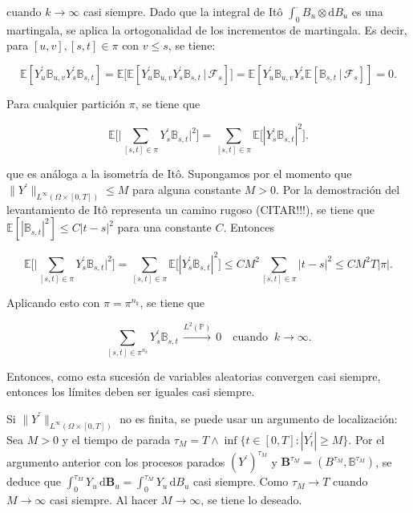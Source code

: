 cuando $k \rightarrow \infty$ casi siempre. Dado que la integral de Itô $\int_{0}^{\cdot}B_{u}\otimes\mathrm{d}B_{u}$ es una martingala, se aplica la ortogonalidad de los incrementos de martingala. Es decir, para $[u,v],[s,t]\in\pi$ con $v\leq s$, se tiene: 

\[
\mathbb{E}[Y^{\prime}_{u}\mathbb{B}_{u,v}Y^{\prime}_{s}\mathbb{B}_{s,t}]=\mathbb{E}\big[\mathbb{E}[Y^{\prime}_{u}\mathbb{B}_{u,v}Y^{\prime}_{s}\mathbb{B}_{s,t}\,|\,\mathcal{F}_{s}]\big]=\mathbb{E}[Y^{\prime}_{u}\mathbb{B}_{u,v}Y^{\prime}_{s}\mathbb{E}[\mathbb{B}_{s,t}\,|\,\mathcal{F}_{s}]]=0.
\]

Para cualquier partición $\pi$, se tiene que

\[
\mathbb{E}\bigg[\bigg|\sum_{[s,t]\in\pi}Y^{\prime}_{s}\mathbb{B}_{s,t}\bigg|^{2}\bigg]=\sum_{[s,t]\in\pi}\mathbb{E}\big[|Y^{\prime}_{s}\mathbb{B}_{s,t}|^{2}\big].
\]


que es análoga a la isometría de Itô. Supongamos por el momento que $\|Y^{\prime}\|_{L^{\infty}(\Omega\times[0,T])}\leq M$ para alguna constante $M>0$. Por la demostración del levantamiento de Itô representa un camino rugoso (CITAR!!!), se tiene que $\mathbb{E}[\left|\mathbb{B}_{s,t}\right|^{2}]\leq C|t-s|^{2}$ para una constante $C$. Entonces

\[
\mathbb{E}\bigg[\bigg|\sum_{[s,t]\in\pi}Y^{\prime}_{s}\mathbb{B}_{s,t}\bigg|^{2}\bigg]=\sum_{[s,t]\in\pi}\mathbb{E}\big[|Y^{\prime}_{s}\mathbb{B}_{s,t}|^{2}\big]\leq CM^{2}\sum_{[s,t]\in\pi}|t-s|^{2}\leq CM^{2}T|\pi|. %
\]

Aplicando esto con $\pi=\pi^{n_{k}}$, se tiene que

\[
\sum_{[s,t]\in\pi^{n_{k}}}Y^{\prime}_{s}\mathbb{B}_{s,t}\,\xrightarrow{L^{2}(\mathbb{P})}\,0\quad \text{cuando}\;\;k\to\infty.
\]

Entonces, como esta sucesión de variables aleatorias convergen casi siempre, entonces los límites deben ser iguales casi siempre.

Si $\|Y^{\prime}\|_{L^{\infty}(\Omega\times[0,T])}$ no es finita, se puede usar un argumento de localización: Sea $M>0$ y el tiempo de parada $\tau_{M}=T\wedge\inf\{t\in[0,T]:|Y^{\prime}_{t}|\geq M\}$. Por el argumento anterior con los procesos parados $(Y^{\prime})^{\tau_{M}}$ y $\mathbf{B}^{\tau_{M}}=(B^{\tau_{M}},\mathbb{B}^{\tau_{M}})$, se deduce que $\int_{0}^{\tau_{M}}Y_{u}\,\mathrm{d}\mathbf{B}_{u}=\int_{0}^{\tau_{M}}Y_{u}\,\mathrm{d}B_{u}$ casi siempre. Como $\tau_{M}\to T$ cuando $M\to\infty$ casi siempre. Al hacer $M \rightarrow \infty$, se tiene lo deseado.


